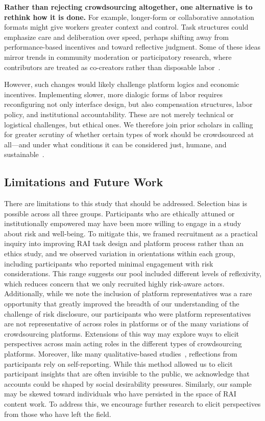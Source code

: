 \textbf{Rather than rejecting crowdsourcing altogether, one alternative is to rethink how it is done.} For example, longer-form or collaborative annotation formats might give workers greater context and control. Task structures could emphasize care and deliberation over speed, perhaps shifting away from performance-based incentives and toward reflective judgment. Some of these ideas mirror trends in community moderation or participatory research, where contributors are treated as co-creators rather than disposable labor~\cite{wang2022whose}.

However, such changes would likely challenge platform logics and economic incentives. Implementing slower, more dialogic forms of labor requires reconfiguring not only interface design, but also compensation structures, labor policy, and institutional accountability. These are not merely technical or logistical challenges, but ethical ones. We therefore join prior scholars in calling for greater scrutiny of whether certain types of work should be crowdsourced at all—and under what conditions it can be considered just, humane, and sustainable~\cite{gray2016crowd,roberts2019behind}.


\subsection{Limitations and Future Work}
There are limitations to this study that should be addressed. Selection bias is possible across all three groups. Participants who are ethically attuned or institutionally empowered may have been more willing to engage in a study about risk and well-being. To mitigate this, we framed recruitment as a practical inquiry into improving RAI task design and platform process rather than an ethics study, and we observed variation in orientations within each group, including participants who reported minimal engagement with risk considerations. This range suggests our pool included different levels of reflexivity, which reduces concern that we only recruited highly risk-aware actors. Additionally, while we note the inclusion of platform representatives was a rare opportunity that greatly improved the breadth of our understanding of the challenge of risk disclosure, our participants who were platform representatives are not representative of across roles in platforms or of the many variations of crowdsourcing platforms. Extensions of this way may explore ways to elicit perspectives across main acting roles in the different types of crowdsourcing platforms. Moreover, like many qualitative-based studies~\cite{tang2024ai}, reflections from participants rely on self-reporting. While this method allowed us to elicit participant insights that are often invisible to the public, we acknowledge that accounts could be shaped by social desirability pressures. Similarly, our sample may be skewed toward individuals who have persisted in the space of RAI content work. To address this, we encourage further research to elicit perspectives from those who have left the field.